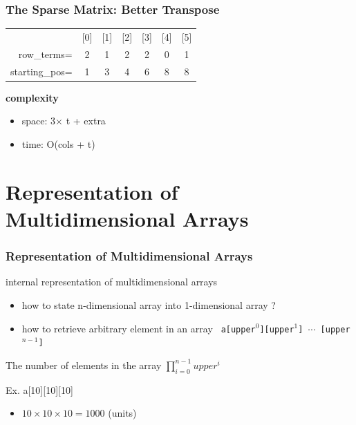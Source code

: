 \documentclass[newPxFont,sthlmFooter,nooffset]{beamer}
\begin{document}
\begin{frame}[t, fragile]
  \frametitle{The Sparse Matrix: Better Transpose}
  \begin{tabular}{r  *{6}{c}}
    & [0] & [1] & [2] & [3] & [4] & [5] \\
row\_terms= & 2 & 1 & 2 & 2 & 0 & 1 \\
starting\_pos= & 1 & 3 & 4 & 6 & 8 & 8\\
  \end{tabular}

\textbf{complexity}
\begin{itemize}
\item space: 3$\times$ t + extra
\item time: O(cols + t)
\end{itemize}
\end{frame}

\section{Representation of Multidimensional Arrays}



\begin{frame}[t, fragile]
  \frametitle{Representation of Multidimensional Arrays}
internal representation of multidimensional arrays
\begin{itemize}
\item how to state n-dimensional array into 1-dimensional array ?
\item how to retrieve arbitrary element in an array
\texttt{  a[upper$^0$][upper$^1$] $\cdots$ [upper$^{n-1}$]}
\end{itemize}

The number of elements in the array
$\prod ^{n-1}_{i=0} upper^{i}$

Ex. a[10][10][10]
\begin{itemize}
\item $10\times 10 \times 10 = 1000$ (units)
\end{itemize}
\end{frame}
\end{document}

